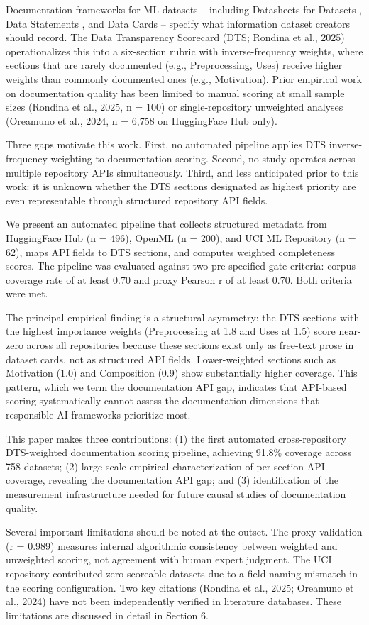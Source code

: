 
Documentation frameworks for ML datasets -- including Datasheets for Datasets \citep{Gebru2021Datasheets}, Data Statements \citep{Bender2018DataStatements}, and Data Cards \citep{Pushkarna2022DataCards} -- specify what information dataset creators should record. The Data Transparency Scorecard (DTS; Rondina et al., 2025) operationalizes this into a six-section rubric with inverse-frequency weights, where sections that are rarely documented (e.g., Preprocessing, Uses) receive higher weights than commonly documented ones (e.g., Motivation). Prior empirical work on documentation quality has been limited to manual scoring at small sample sizes (Rondina et al., 2025, n = 100) or single-repository unweighted analyses (Oreamuno et al., 2024, n = 6,758 on HuggingFace Hub only).

Three gaps motivate this work. First, no automated pipeline applies DTS inverse-frequency weighting to documentation scoring. Second, no study operates across multiple repository APIs simultaneously. Third, and less anticipated prior to this work: it is unknown whether the DTS sections designated as highest priority are even representable through structured repository API fields.

We present an automated pipeline that collects structured metadata from HuggingFace Hub (n = 496), OpenML (n = 200), and UCI ML Repository (n = 62), maps API fields to DTS sections, and computes weighted completeness scores. The pipeline was evaluated against two pre-specified gate criteria: corpus coverage rate of at least 0.70 and proxy Pearson r of at least 0.70. Both criteria were met.

The principal empirical finding is a structural asymmetry: the DTS sections with the highest importance weights (Preprocessing at 1.8 and Uses at 1.5) score near-zero across all repositories because these sections exist only as free-text prose in dataset cards, not as structured API fields. Lower-weighted sections such as Motivation (1.0) and Composition (0.9) show substantially higher coverage. This pattern, which we term the documentation API gap, indicates that API-based scoring systematically cannot assess the documentation dimensions that responsible AI frameworks prioritize most.

This paper makes three contributions: (1) the first automated cross-repository DTS-weighted documentation scoring pipeline, achieving 91.8\% coverage across 758 datasets; (2) large-scale empirical characterization of per-section API coverage, revealing the documentation API gap; and (3) identification of the measurement infrastructure needed for future causal studies of documentation quality.

Several important limitations should be noted at the outset. The proxy validation (r = 0.989) measures internal algorithmic consistency between weighted and unweighted scoring, not agreement with human expert judgment. The UCI repository contributed zero scoreable datasets due to a field naming mismatch in the scoring configuration. Two key citations (Rondina et al., 2025; Oreamuno et al., 2024) have not been independently verified in literature databases. These limitations are discussed in detail in Section 6.

